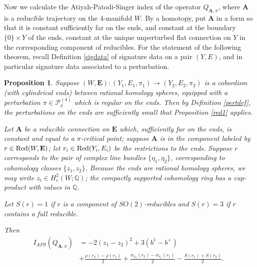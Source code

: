 \documentclass{memo-l}
\newtheorem{proposition}[theorem]{Proposition}
\theoremstyle{definition}
\theoremstyle{remark}
\numberwithin{section}{chapter}
\numberwithin{equation}{chapter}
\begin{document}
Now we calculate the Atiyah-Patodi-Singer index of the operator $Q_{\mathbf{A},\pi}$, where $\mathbf{A}$ is a reducible trajectory on the 4-manifold $W$. By a homotopy, put $\mathbf{A}$ in a form so that it is constant sufficiently far on the ends, and constant at the boundary $\{0\} \times Y$ of the ends, constant at the unique unperturbed flat connection on $Y$ in the corresponding component of reducibles. For the statement of the following theorem, recall Definition \ref{sigdata} of signature data on a pair $(Y,E)$, and in particular signature data associated to a perturbation.

\begin{proposition}\label{index-calculation}
Suppose $(W,\mathbf{E}): (Y_1, E_1,\pi_1) \to (Y_2, E_2,\pi_2)$ is a cobordism (with cylindrical ends) between rational homology spheres, equipped with a perturbation $\pi \in \mathcal P^{(4)}_{\delta}$ which is regular on the ends. Then by Definition \ref{pertdef}, the perturbations on the ends are sufficiently small that Proposition \ref{red1} applies. 

Let $\mathbf{A}$ be a reducible connection on $\mathbf{E}$ which, sufficiently far on the ends, is constant and equal to a $\pi$-critical point; suppose $\mathbf{A}$ is in the component labeled by $r \in \textup{Red}(W,\mathbf{E})$; let $r_i \in \textup{Red}(Y_i,E_i)$ be the restrictions to the ends. Suppose $r$ corresponds to the pair of complex line bundles $\{\eta_1, \eta_2\}$, corresponding to cohomology classes $\{z_1, z_2\}$. Because the ends are rational homology spheres, we may write $z_i \in H^2_c(W;\mathbb Q)$; the compactly supported cohomology ring has a cup-product with values in $\mathbb Q$.

Let $S(r) = 1$ if $r$ is a component of $SO(2)$-reducibles and $S(r) = 3$ if $r$ contains a full reducible.

Then 
\begin{align*}I_{APS}(Q_{\mathbf{A},\pi}) &= -2(z_1 - z_2)^2 +3(b^1-b^+) \\
&+ \frac{\rho(r_2) - \rho(r_1)}{2} + \frac{\sigma_{\pi_2}(r_2) - \sigma_{\pi_1}(r_1)}{2} - \frac{S(r_1) + S(r_2)}{2}.
\end{align*}
\end{proposition}
\end{document}
